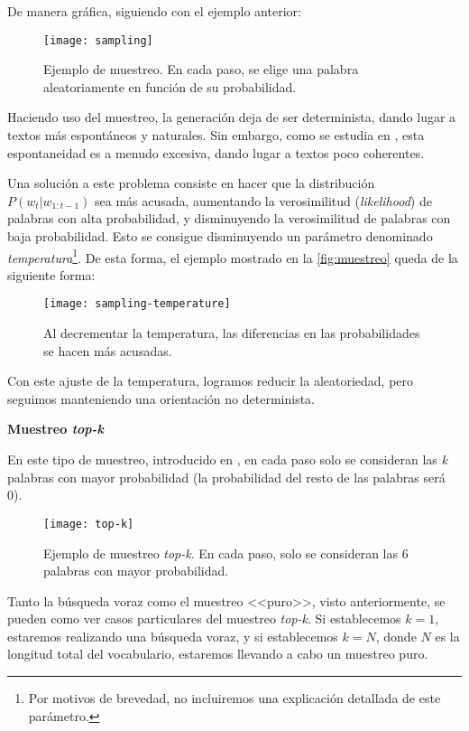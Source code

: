 De manera gráfica, siguiendo con el ejemplo anterior:

\begin{figure}[!h]
	\centering
	\texttt{[image: sampling]}
	\caption[Ejemplo de muestreo.]{Ejemplo de muestreo. En cada paso, se elige una palabra aleatoriamente en función de su probabilidad.}
	\label{fig:muestreo}
\end{figure}

Haciendo uso del muestreo, la generación deja de ser determinista, dando lugar a textos más espontáneos y naturales. Sin embargo, como se estudia en \cite{holtzman20}, esta espontaneidad es a menudo excesiva, dando lugar a textos poco coherentes.

Una solución a este problema consiste en hacer que la distribución $P(w_t|w_{1:t-1})$ sea más acusada, aumentando la verosimilitud (\emph{likelihood}) de palabras con alta probabilidad, y disminuyendo la verosimilitud de palabras con baja probabilidad. Esto se consigue disminuyendo un parámetro denominado \emph{temperatura}\footnote{\hspace{0.06cm}Por motivos de brevedad, no incluiremos una explicación detallada de este parámetro.}. De esta forma, el ejemplo mostrado en la \autoref{fig:muestreo} queda de la siguiente forma:

\begin{figure}[!h]
	\centering
	\texttt{[image: sampling-temperature]}
	\caption[Ejemplo de muestreo con temperatura.]{Al decrementar la temperatura, las diferencias en las  probabilidades se hacen más acusadas.}
\end{figure}

Con este ajuste de la temperatura, logramos reducir la aleatoriedad, pero seguimos manteniendo una orientación no determinista.

\bigskip
\noindent
\textbf{Muestreo \emph{top-k}}

En este tipo de muestreo, introducido en \cite{fan18}, en cada paso solo se consideran las \emph{k} palabras con mayor probabilidad (la probabilidad del resto de las palabras será 0).

\begin{figure}[!h]
	\centering
	\texttt{[image: top-k]}
	\caption[Ejemplo de muestreo \emph{top-k}.]{Ejemplo de muestreo \emph{top-k}. En cada paso, solo se consideran las 6 palabras con mayor probabilidad.}
	\label{fig:top-k}
\end{figure}

Tanto la búsqueda voraz como el muestreo <<puro>>, visto anteriormente, se pueden como ver casos particulares del muestreo \emph{top-k}. Si establecemos $k = 1$, estaremos realizando una búsqueda voraz, y si establecemos $k = N$, donde $N$ es la longitud total del vocabulario, estaremos llevando a cabo un muestreo puro.

